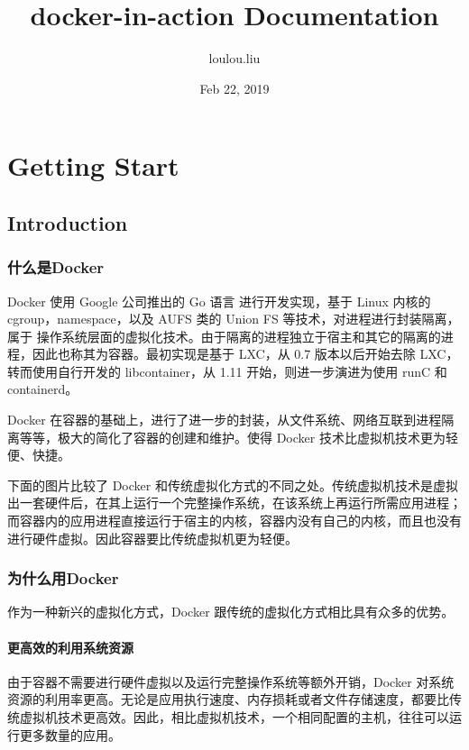 \documentclass[letterpaper,10pt,english]{sphinxmanual}
\title{docker-in-action Documentation}
\date{Feb 22, 2019}
\author{loulou.liu}
\begin{document}
\pagestyle{empty}
\sphinxmaketitle
\pagestyle{plain}
\sphinxtableofcontents
\pagestyle{normal}
\label{\detokenize{index::doc}}



\chapter{Getting Start}
\label{\detokenize{docker/intro:getting-start}}\label{\detokenize{docker/intro::doc}}

\section{Introduction}
\label{\detokenize{docker/intro:introduction}}

\subsection{什么是Docker}
\label{\detokenize{docker/intro:docker}}
Docker 使用 Google 公司推出的 Go 语言 进行开发实现，基于 Linux 内核的 cgroup，namespace，以及 AUFS 类的 Union FS 等技术，对进程进行封装隔离，属于 操作系统层面的虚拟化技术。由于隔离的进程独立于宿主和其它的隔离的进程，因此也称其为容器。最初实现是基于 LXC，从 0.7 版本以后开始去除 LXC，转而使用自行开发的 libcontainer，从 1.11 开始，则进一步演进为使用 runC 和 containerd。

Docker 在容器的基础上，进行了进一步的封装，从文件系统、网络互联到进程隔离等等，极大的简化了容器的创建和维护。使得 Docker 技术比虚拟机技术更为轻便、快捷。

下面的图片比较了 Docker 和传统虚拟化方式的不同之处。传统虚拟机技术是虚拟出一套硬件后，在其上运行一个完整操作系统，在该系统上再运行所需应用进程；而容器内的应用进程直接运行于宿主的内核，容器内没有自己的内核，而且也没有进行硬件虚拟。因此容器要比传统虚拟机更为轻便。







\subsection{为什么用Docker}
\label{\detokenize{docker/intro:id1}}
作为一种新兴的虚拟化方式，Docker 跟传统的虚拟化方式相比具有众多的优势。


\subsubsection{更高效的利用系统资源}
\label{\detokenize{docker/intro:id2}}
由于容器不需要进行硬件虚拟以及运行完整操作系统等额外开销，Docker 对系统资源的利用率更高。无论是应用执行速度、内存损耗或者文件存储速度，都要比传统虚拟机技术更高效。因此，相比虚拟机技术，一个相同配置的主机，往往可以运行更多数量的应用。
\end{document}

